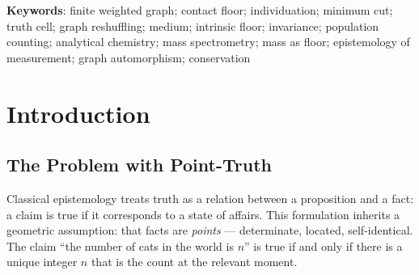 \documentclass[11pt,twocolumn,a4paper]{article}
\theoremstyle{plain}
\theoremstyle{definition}
\theoremstyle{remark}
\newcommand{\bmin}{\beta_{\min}}
\begin{document}
\begin{abstract}
We apply the framework to four cases: (i) population counting, where the
count of a finite population is shown to be a real-valued interval
$[n, n+1)$ at any instant of observation, not an integer; (ii) analytical
chemistry, where each instrument generation is a graph expansion adding new
neighbour nodes to the medium, increasing individuation depth without
approaching identity; (iii) mass spectrometry specifically, where mass is
identified as the intrinsic floor $\bmin^*(v)$ --- the only property of an
ion that is invariant across all instrument generations, matrices, and
sample preparation histories; and (iv) the epistemology of classification,
where the sufficient truth of any classified object is the structured set of
graph-theoretic unknowables constituting its contact floor.

The paper contains no appeal to truth as correspondence, identity as
self-predication, or measurement as revelation. All claims are expressed
as properties of finite weighted graphs.

\end{abstract}

\vspace{1em}
\noindent\textbf{Keywords}: finite weighted graph; contact floor; individuation;
minimum cut; truth cell; graph reshuffling; medium; intrinsic floor; invariance;
population counting; analytical chemistry; mass spectrometry; mass as floor;
epistemology of measurement; graph automorphism; conservation

\tableofcontents
\newpage

\section{Introduction}
\label{sec:introduction}

\subsection{The Problem with Point-Truth}

Classical epistemology treats truth as a relation between a proposition and
a fact: a claim is true if it corresponds to a state of affairs. This
formulation inherits a geometric assumption: that facts are \emph{points} ---
determinate, located, self-identical. The claim ``the number of cats in the
world is $n$'' is true if and only if there is a unique integer $n$ that is
the count at the relevant moment.
\end{document}
